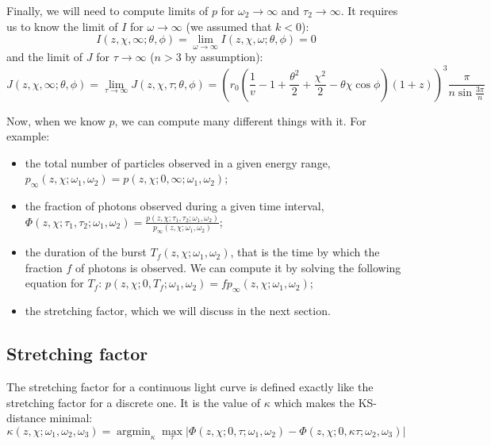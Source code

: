 \documentclass{article}
\DeclareMathOperator*{\argmin}{argmin}
\begin{document}
Finally, we will need to compute limits of $p$ for $\omega_2 \rightarrow \infty$ and $\tau_2 \rightarrow \infty$. It requires us to know the limit of $I$ for $\omega \rightarrow \infty$ (we assumed that $k < 0$):
\begin{equation}
I\left(z,\chi,\infty;\theta,\phi\right) = \lim_{\omega \rightarrow \infty} I\left(z,\chi,\omega;\theta,\phi\right) = 0
\end{equation}
and the limit of $J$ for $\tau \rightarrow \infty$ ($n > 3$ by assumption):
\begin{equation}
J\left(z,\chi,\infty;\theta,\phi\right) = \lim_{\tau \rightarrow \infty} J\left(z,\chi,\tau;\theta,\phi\right) = \left(r_0 \left( \frac{1}{v} -  1 + \frac{\theta^2}{2} + \frac{\chi^2}{2} - \theta\chi\cos\phi \right) \left(1+z\right)\right)^3 \frac{\pi}{n\sin\frac{3\pi}{n}}
\end{equation}

Now, when we know $p$, we can compute many different things with it. For example:
\begin{itemize}
\item{the total number of particles observed in a given energy range, $p_\infty\left(z,\chi; \omega_1,\omega_2\right) = p\left( z,\chi; 0,\infty; \omega_1,\omega_2 \right)$;}
\item{the fraction of photons observed during a given time interval, $\Phi\left(z,\chi; \tau_1,\tau_2; \omega_1,\omega_2\right) = \frac{p\left( z,\chi; \tau_1,\tau_2; \omega_1,\omega_2\right)}{p_\infty\left( z,\chi; \omega_1,\omega_2 \right)}$;}
\item{the duration of the burst $T_f\left( z,\chi;\omega_1,\omega_2 \right)$, that is the time by which the fraction $f$ of photons is observed. We can compute it by solving the following equation for $T_f$: $p\left( z,\chi; 0,T_f; \omega_1,\omega_2\right) = f p_\infty\left( z,\chi; \omega_1,\omega_2 \right)$;}
\item{the stretching factor, which we will discuss in the next section.}
\end{itemize}

\subsection{Stretching factor}
The stretching factor for a continuous light curve is defined exactly like the stretching factor for a discrete one. It is the value of $\kappa$ which makes the KS-distance minimal:
\begin{equation}
\kappa\left(z,\chi; \omega_1, \omega_2, \omega_3\right) = \argmin_\kappa \max_\tau\left| \Phi\left(z,\chi; 0,\tau; \omega_1,\omega_2\right) - \Phi\left( z,\chi; 0,\kappa \tau; \omega_2,\omega_3 \right) \right|
\end{equation}
\end{document}

